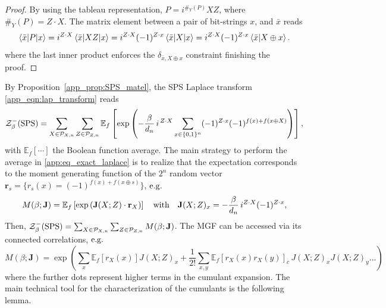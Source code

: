 \documentclass[aps,pra,superscriptaddress,twocolumn,longbibliography]{revtex4-2}
\begin{document}
\begin{proof}
By using the tableau representation, $P=i^{\#_{Y}(P)} X Z$, where $\#_{Y}(P)=Z \cdot X$. The matrix element between a pair of bit-strings $x$, and $\bar{x}$ reads
%
 \begin{equation}
    \braket{\bar{x}|P|x}= i^{Z \cdot X}\braket{\bar{x}|X Z|x}=i^{Z\cdot X}(-1)^{Z \cdot x}\braket{\bar{x}|X|x}=i^{Z\cdot X}(-1)^{Z \cdot x}\braket{\bar{x}|X\oplus x}.
    \end{equation}
%
where the last inner product enforces the $\delta_{\bar{x},X\oplus x}$ constraint finishing the proof. 
\end{proof}
%
By Proposition~\ref{app_prop:SPS_matel}, the SPS Laplace transform \eqref{app_eqn:lap_transform} reads
%
\begin{equation}
\label{app:eq_exact_laplace}
    \mathcal{Z}^{-}_{\beta}({\rm SPS}) =\sum_{X\in \mathcal{P}_{X,n}}\sum_{Z \in \mathcal{P}_{Z,n} }\mathbb{E}_{f}\left[\exp\left(-\frac{\beta}{d_{n}}\,i^{\,Z\cdot X}\sum_{x \in \{0,1\}^{n}}(-1)^{Z\cdot x}(-1)^{f(x)+f(x\oplus X) }\right)\right],
\end{equation}
%
with $\mathbb{E}_{f}[\cdots]$ the Boolean function average. The main strategy to perform the average in \eqref{app:eq_exact_laplace} is to realize that the expectation corresponds to the moment generating function of the $2^{n}$  random vector $ \textbf{r}_{s}= \{r_{s}(x)=(-1)^{f(x)+f(x \oplus s)}\}$, ${\rm e.g.}$
%
\begin{equation}
    M(\beta; {\textbf{J}})=\mathbb{E}_{f} \left[\exp{\left({\textbf J}(X;Z) \cdot {\textbf r}_{X} \right)}\right] \quad  \text{with} \quad {\textbf J}(X;Z)_{x}=-\frac{\beta}{d_{n}} \, i^{Z \cdot X}(-1)^{Z \cdot x},
\end{equation}
%
Then, $ \mathcal{Z}^{-}_{\beta}({\rm SPS}) =\sum_{X\in \mathcal{P}_{X,n}}\sum_{Z \in \mathcal{P}_{Z,n}}  M(\beta; {\textbf{J}})$. 
The MGF can be accessed via its connected correlations, ${\rm e.g.}$
%
\begin{equation}
\label{app_eq:f_commulant_expansion}
    M(\beta; {\textbf{J}})=\exp{\left(\sum_{x}\mathbb{E}_{f}[{r}_{X}(x)]J(X;Z)_{x} +\frac{1}{2!}\sum_{x,y} \mathbb{E}_{f}[r_{X}(x)r_{X}(y)]_{c}\,J(X;Z)_{x} J(X;Z)_{y} \dots \right)}
\end{equation}
%
where the further dots represent higher terms in the cumulant expansion. The main technical tool for the characterization of the cumulants is the following lemma.
\end{document}
